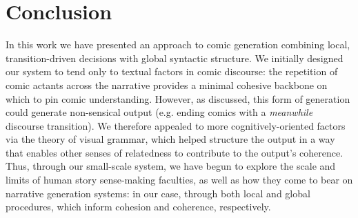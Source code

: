 \section{Conclusion}

In this work we have presented an approach to comic generation combining
local, transition-driven decisions with global syntactic structure. We
initially designed our system to tend only to textual factors in
comic discourse: the repetition of comic actants across the narrative
provides a minimal cohesive backbone on which to pin comic understanding.
%
However, as discussed, this form of generation could generate non-sensical
output (e.g. ending comics with a \emph{meanwhile} discourse transition).
We therefore appealed to more cognitively-oriented factors via the theory
of visual grammar, which helped structure the output in a way that enables
other senses of relatedness to contribute to the output's coherence.
%
Thus, through our small-scale system, we have begun to explore the scale
and limits of human story sense-making faculties, as well as how they come
to bear on narrative generation systems: in our case, through both local
and global procedures, which inform cohesion and coherence, respectively. 
%

